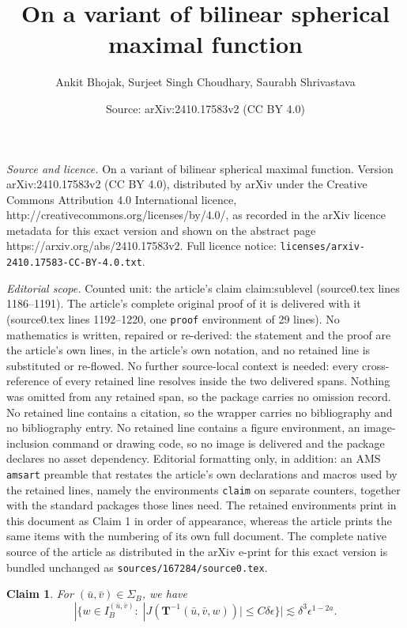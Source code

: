 \documentclass[10pt,a4paper]{amsart}
\title{On a variant of bilinear spherical maximal function}
\author{Ankit Bhojak, Surjeet Singh Choudhary, Saurabh Shrivastava}
\date{Source: arXiv:2410.17583v2 (CC BY 4.0)}
\newtheorem{claim}{Claim}
\begin{document}
\maketitle

\noindent\emph{Source and licence.} On a variant of bilinear spherical maximal function. Version arXiv:2410.17583v2 (CC BY 4.0), distributed by arXiv under the Creative Commons Attribution 4.0 International licence, http://creativecommons.org/licenses/by/4.0/, as recorded in the arXiv licence metadata for this exact version and shown on the abstract page https://arxiv.org/abs/2410.17583v2. Full licence notice: \texttt{licenses/arxiv-2410.17583-CC-BY-4.0.txt}.\par\smallskip

\noindent\textit{Editorial scope.} Counted unit: the article's claim claim:sublevel (source0.tex lines 1186--1191). The article's complete original proof of it is delivered with it (source0.tex lines 1192--1220, one \texttt{proof} environment of 29 lines). No mathematics is written, repaired or re-derived: the statement and the proof are the article's own lines, in the article's own notation, and no retained line is substituted or re-flowed.  No further source-local context is needed: every cross-reference of every retained line resolves inside the two delivered spans.  Nothing was omitted from any retained span, so the package carries no omission record.  No retained line contains a citation, so the wrapper carries no bibliography and no bibliography entry.  No retained line contains a figure environment, an image-inclusion command or drawing code, so no image is delivered and the package declares no asset dependency.  Editorial formatting only, in addition: an AMS \texttt{amsart} preamble that restates the article's own declarations and macros used by the retained lines, namely the environments \texttt{claim} on separate counters, together with the standard packages those lines need.  The retained environments print in this document as Claim 1 in order of appearance, whereas the article prints the same items with the numbering of its own full document.  The complete native source of the article as distributed in the arXiv e-print for this exact version is bundled unchanged as \texttt{sources/167284/source0.tex}.
	\begin{claim}\label{claim:sublevel}
		For $(\bar u,\bar v)\in\Sigma_B$, we have
		\begin{equation*}
			|\{w\in I_B^{(\bar u,\bar v)}:\;|J(\boldsymbol{T}^{-1}(\bar u,\bar v,w))|\leq C\delta\epsilon\}|\lesssim\delta^3\epsilon^{1-2a}.
		\end{equation*}
	\end{claim}
\end{document}
